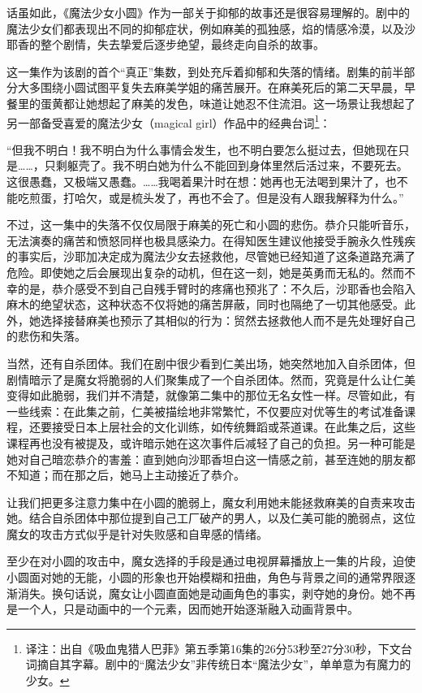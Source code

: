 话虽如此，《魔法少女小圆》作为一部关于抑郁的故事还是很容易理解的。剧中的魔法少女们都表现出不同的抑郁症状，例如麻美的孤独感，焰的情感冷漠，以及沙耶香的整个剧情，失去挚爱后逐步绝望，最终走向自杀的故事。

这一集作为该剧的首个“真正”集数，到处充斥着抑郁和失落的情绪。剧集的前半部分大多围绕小圆试图平复失去麻美学姐的痛苦展开。在麻美死后的第二天早晨，早餐里的蛋黄都让她想起了麻美的发色，味道让她忍不住流泪。这一场景让我想起了另一部备受喜爱的魔法少女（magical girl）作品中的经典台词\footnote{译注：出自《吸血鬼猎人巴菲》第五季第16集的26分53秒至27分30秒，下文台词摘自其字幕。剧中的“魔法少女”非传统日本“魔法少女”，单单意为有魔力的少女。}：

“但我不明白！我不明白为什么事情会发生，也不明白要怎么挺过去，但她现在只是……，只剩躯壳了。我不明白她为什么不能回到身体里然后活过来，不要死去。这很愚蠢，又极端又愚蠢。……我喝着果汁时在想：她再也无法喝到果汁了，也不能吃煎蛋，打哈欠，或是梳头发了，再也不会了。但是没有人跟我解释为什么。”\cite{ref31}

不过，这一集中的失落不仅仅局限于麻美的死亡和小圆的悲伤。恭介只能听音乐，无法演奏的痛苦和愤怒同样也极具感染力。在得知医生建议他接受手腕永久性残疾的事实后，沙耶加决定成为魔法少女去拯救他，尽管她已经知道了这条道路充满了危险。即使她之后会展现出复杂的动机，但在这一刻，她是英勇而无私的。然而不幸的是，恭介感受不到自己自残手臂时的疼痛也预兆了：不久后，沙耶香也会陷入麻木的绝望状态，这种状态不仅将她的痛苦屏蔽，同时也隔绝了一切其他感受。此外，她选择接替麻美也预示了其相似的行为：贸然去拯救他人而不是先处理好自己的悲伤和失落。

当然，还有自杀团体。我们在剧中很少看到仁美出场，她突然地加入自杀团体，但剧情暗示了是魔女将脆弱的人们聚集成了一个自杀团体。然而，究竟是什么让仁美变得如此脆弱，我们并不清楚，就像第二集中的那位无名女性一样。尽管如此，有一些线索：在此集之前，仁美被描绘地非常繁忙，不仅要应对优等生的考试准备课程，还要接受日本上层社会的文化训练，如传统舞蹈或茶道课。在此集之后，这些课程再也没有被提及，或许暗示她在这次事件后减轻了自己的负担。另一种可能是她对自己暗恋恭介的害羞：直到她向沙耶香坦白这一情感之前，甚至连她的朋友都不知道；而在那之后，她马上主动接近了恭介。

让我们把更多注意力集中在小圆的脆弱上，魔女利用她未能拯救麻美的自责来攻击她。结合自杀团体中那位提到自己工厂破产的男人，以及仁美可能的脆弱点，这位魔女的攻击方式似乎是针对失败感和自卑感的情绪。

至少在对小圆的攻击中，魔女选择的手段是通过电视屏幕播放上一集的片段，迫使小圆面对她的无能，小圆的形象也开始模糊和扭曲，角色与背景之间的通常界限逐渐消失。换句话说，魔女让小圆直面她是动画角色的事实，剥夺她的身份。她不再是一个人，只是动画中的一个元素，因而她开始逐渐融入动画背景中。

